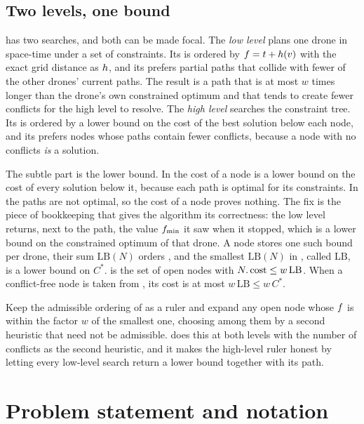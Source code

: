 \subsection{Two levels, one bound}

\cbs has two searches, and both can be made focal. The \emph{low level} plans
one drone in space-time under a set of constraints. Its \Open is ordered by
$f = t + h(v)$ with the exact grid distance as $h$, and its
\Focal prefers partial paths that collide with fewer of the other drones'
current paths. The result is a path that is at most $w$ times longer than the
drone's own constrained optimum and that tends to create fewer conflicts for
the high level to resolve. The \emph{high level} searches the constraint tree.
Its \Open is ordered by a lower bound on the cost of the best solution below
each node, and its \Focal prefers nodes whose paths contain fewer conflicts,
because a node with no conflicts \emph{is} a solution.

The subtle part is the lower bound. In \cbs the cost of a node is a lower
bound on the cost of every solution below it, because each path is optimal
for its constraints. In \ecbs the paths are not optimal, so the cost of a node
proves nothing. The fix is the piece of bookkeeping that gives the algorithm
its correctness: the low level returns, next to the path, the value
$f_{\min}$ it saw when it stopped, which is a lower bound on the
constrained optimum of that drone. A node stores one such bound per drone,
their sum $\mathrm{LB}(N)$ orders \Open, and the smallest $\mathrm{LB}(N)$ in
\Open, called $\mathrm{LB}$, is a lower bound on $C^*$. \Focal is the set of
open nodes with $N.\operatorname{cost} \le w\,\mathrm{LB}$. When a conflict-free node is
taken from \Focal, its cost is at most $w\,\mathrm{LB} \le w\,C^*$.

\begin{keyidea}
Keep the admissible ordering of \Open as a ruler and expand any open node whose
$f$ is within the factor $w$ of the smallest one, choosing among them by
a second heuristic that need not be admissible. \ecbs does this at both
levels with the number of conflicts as the second heuristic, and it makes the
high-level ruler honest by letting every low-level search return a lower
bound together with its path.
\end{keyidea}

\section{Problem statement and notation}
\label{sec:ch10-problem}

